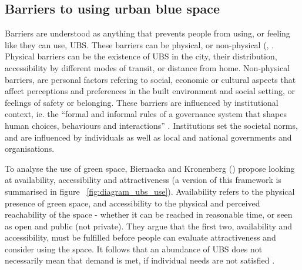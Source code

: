 \documentclass{article}
\begin{document}
\subsection{Barriers to using urban blue space}


Barriers are understood as anything that prevents people from using, or feeling like they can use, UBS.
These barriers can be physical, or non-physical (\cite{biernacka2018classification}, \cite{wolff2022conceptualizing}. Physical barriers can be the existence of UBS in the city, their distribution, accessibility by different modes of transit, or distance from home. Non-physical barriers, are personal factors refering to social, economic or cultural aspects that affect perceptions and preferences in the built environment and social setting, or feelings of safety or belonging. These barriers are influenced by institutional context, ie. the ``formal and informal rules of a governance system that shapes human choices, behaviours and interactions'' \parencite{wolff2022conceptualizing}. Institutions set the societal norms, and are influenced by individuals as well as local and national governments and organisations.

To analyse the use of green space, Biernacka and Kronenberg (\citeyear{biernacka2018classification}) propose looking at availability, accessibility and attractiveness (a version of this framework is summarised in figure ~\ref{fig:diagram_ubs_use}).
Availability refers to the physical presence of green space, and accessibility to the physical and perceived reachability of the space - whether it can be reached in reasonable time, or seen as open and public (not private). 
They argue that the first two, availability and accessibility, must be fulfilled before people can evaluate attractiveness and consider using the space. It follows that an abundance of UBS does not necessarily mean that demand is met, if individual needs are not satisfied \parencite{phillips2021use}.
\end{document}
